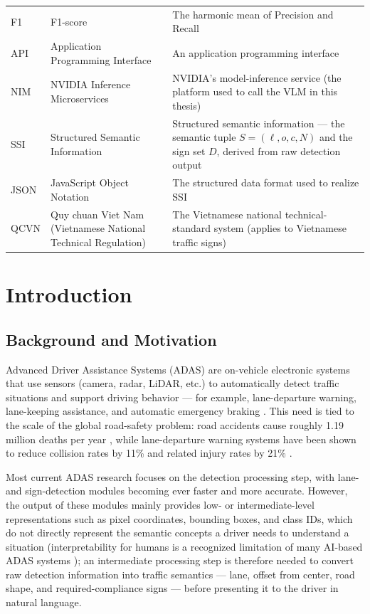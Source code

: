 \documentclass[12pt,a4paper]{report}
\begin{document}
\begin{longtable}{@{}p{2.2cm}p{4.2cm}p{7.5cm}@{}}
    F1 & F1-score & The harmonic mean of Precision and Recall \\
    API & Application Programming Interface & An application programming interface \\
    NIM & NVIDIA Inference Microservices & NVIDIA's model-inference service (the platform used to call the VLM in this thesis) \\
    SSI & Structured Semantic Information & Structured semantic information --- the semantic tuple $S=(\ell,o,c,N)$ and the sign set $D$, derived from raw detection output \\
    JSON & JavaScript Object Notation & The structured data format used to realize SSI \\
    QCVN & Quy chuan Viet Nam (Vietnamese National Technical Regulation) & The Vietnamese national technical-standard system (applies to Vietnamese traffic signs) \\
    \bottomrule
\end{longtable}

\setcounter{page}{1}

\chapter{Introduction}

\section{Background and Motivation}

Advanced Driver Assistance Systems (ADAS) are on-vehicle electronic systems that use sensors (camera, radar, LiDAR, etc.) to automatically detect traffic situations and support driving behavior --- for example, lane-departure warning, lane-keeping assistance, and automatic emergency braking \cite{nidamanuri2022adas}. This need is tied to the scale of the global road-safety problem: road accidents cause roughly 1.19 million deaths per year \cite{who2023roadsafety}, while lane-departure warning systems have been shown to reduce collision rates by 11\% and related injury rates by 21\% \cite{iihs2017lanedeparture}.

Most current ADAS research focuses on the detection processing step, with lane- and sign-detection modules becoming ever faster and more accurate. However, the output of these modules mainly provides low- or intermediate-level representations such as pixel coordinates, bounding boxes, and class IDs, which do not directly represent the semantic concepts a driver needs to understand a situation (interpretability for humans is a recognized limitation of many AI-based ADAS systems \cite{kuznietsov2024xai}); an intermediate processing step is therefore needed to convert raw detection information into traffic semantics --- lane, offset from center, road shape, and required-compliance signs --- before presenting it to the driver in natural language.
\end{document}
